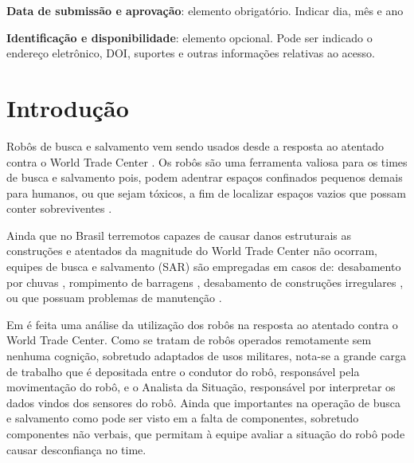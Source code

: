 \documentclass[
	article,			%
	11pt,				%
	oneside,			%
	a4paper,			%
	english,			%
	brazil,				%
	sumario=tradicional	
	]{abntex2}
\begin{document}

\begin{center}\smaller
\textbf{Data de submissão e aprovação}: elemento obrigatório. Indicar dia, mês e ano

\textbf{Identificação e disponibilidade}: elemento opcional. Pode ser indicado 
o endereço eletrônico, DOI, suportes e outras informações relativas ao acesso.
\end{center}

\textual


\section{Introdução}
Robôs de busca e salvamento vem sendo usados desde a resposta ao atentado contra o World Trade Center \cite{Robin2004}. Os robôs são uma ferramenta valiosa para os times de busca e salvamento pois, podem adentrar espaços confinados pequenos demais para humanos, ou que sejam tóxicos, a fim de localizar espaços vazios que possam conter sobreviventes \cite{Robin2004}.

Ainda que no Brasil terremotos capazes de causar danos estruturais as construções e atentados da magnitude do World Trade Center não ocorram, equipes de busca e salvamento (SAR) são empregadas em casos de: desabamento por chuvas \cite{serrana2022}, rompimento de barragens \cite{bruma2019}, desabamento de construções irregulares \cite{rio2021}, ou que possuam problemas de manutenção \cite{sp2020}.

Em \cite{Robin2004} é feita uma análise da utilização dos robôs na resposta ao atentado contra o World Trade Center. Como se tratam de robôs operados remotamente sem nenhuma cognição, sobretudo adaptados de usos militares, nota-se a grande carga de trabalho que é depositada entre o condutor do robô, responsável pela movimentação do robô, e o Analista da Situação, responsável por interpretar os dados vindos dos sensores do robô. Ainda que importantes na operação de busca e salvamento como pode ser visto em  \cite{akgun2022using} a falta de componentes, sobretudo componentes não verbais, que permitam à equipe avaliar a situação do robô pode causar desconfiança no time.
\end{document}
